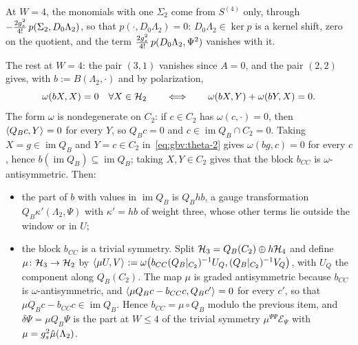 At $W = 4$, the monomials with one $\Sigma_2$ come from $S^{(4)}$ only, through $- \tfrac{2 g_s^2}{4!} \, p(\Sigma_2, D_0 \Lambda_2)$, so that $p(\cdot, D_0 \Lambda_2) = 0$: $D_0 \Lambda_2 \in \ker p$ is a kernel shift, zero on the quotient, and the term $\tfrac{2 g_s^2}{4!} \, p(D_0 \Lambda_2, \Psi^2)$ vanishes with it.

The rest at $W = 4$: the pair $(3, 1)$ vanishes since $A = 0$, and the pair $(2, 2)$ gives, with $b := B(\Lambda_2, \cdot)$ and by polarization,
\begin{equation}
  \label{eq:gbv:theta-2}
  \omega(b X, X)
    = 0
  \quad
  \forall X \in \mathcal{H}_2
  \qquad
  \Longleftrightarrow
  \qquad
  \omega(b X, Y) + \omega(b Y, X)
    = 0.
\end{equation}
The form $\omega$ is nondegenerate on $C_2$: if $c \in C_2$ has $\omega(c, \cdot) = 0$, then $\braket{Q_B c, Y}_{} = 0$ for every $Y$, so $Q_B c = 0$ and $c \in \operatorname{im} Q_B \cap C_2 = 0$.
Taking $X = g \in \operatorname{im} Q_B$ and $Y = c \in C_2$ in~\eqref{eq:gbv:theta-2} gives $\omega(b g, c) = 0$ for every $c$, hence $b(\operatorname{im} Q_B) \subseteq \operatorname{im} Q_B$; taking $X, Y \in C_2$ gives that the block $b_{CC}$ is $\omega$-antisymmetric.
Then:
\begin{itemize}
  \item the part of $b$ with values in $\operatorname{im} Q_B$ is $Q_B h b$, a gauge transformation $Q_B \kappa'(\Lambda_2, \Psi)$ with $\kappa' = h b$ of weight three, whose other terms lie outside the window or in $U$;
  \item the block $b_{CC}$ is a trivial symmetry.
    Split $\mathcal{H}_3 = Q_B(C_2) \oplus h \mathcal{H}_4$ and define $\mu \colon \mathcal{H}_3 \to \mathcal{H}_2$ by $\braket{\mu U, V}_{} := \omega\big( b_{CC} (Q_B|_{C_2})^{-1} U_Q, (Q_B|_{C_2})^{-1} V_Q \big)$, with $U_Q$ the component along $Q_B(C_2)$.
    The map $\mu$ is graded antisymmetric because $b_{CC}$ is $\omega$-antisymmetric, and $\braket{\mu Q_B c - b_{CC} c, Q_B c'}_{} = 0$ for every $c'$, so that $\mu Q_B c - b_{CC} c \in \operatorname{im} Q_B$.
    Hence $b_{CC} = \mu \circ Q_B$ modulo the previous item, and $\delta \Psi = \mu Q_B \Psi$ is the part at $W \le 4$ of the trivial symmetry $\mu^{\Psi \Psi} \mathcal E_\Psi$ with $\mu = g_s^2 \hat\mu(\Lambda_2)$.
\end{itemize}


